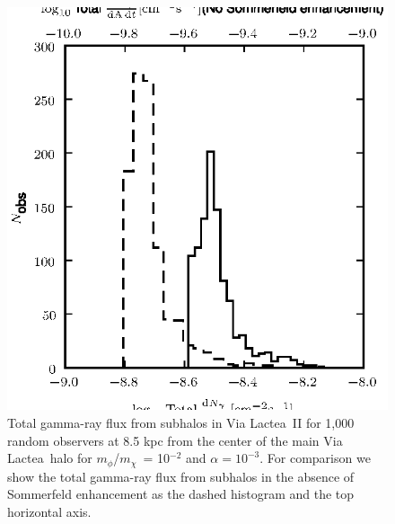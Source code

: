 \documentclass[aps,prd,twocolumn,amsmath,amssymb,floatfix,nofootinbib,10pt]{revtex4}
\newcommand{\VL}{Via Lactea}
\newcommand{\mdm}{\ensuremath{m_{\chi}}}
\newcommand{\mv}{\ensuremath{m_{\phi}}}
\begin{document}
\begin{figure}
\centering
\includegraphics{hist_-2_-3_10_3.eps}
\caption{Total gamma-ray flux from subhalos in \VL\ II for 1,000
random observers at 8.5 kpc from the center of the main \VL\ halo for
\mv/\mdm\ = 10$^{-2}$ and $\alpha = 10^{-3}$. For comparison we show
the total gamma-ray flux from subhalos in the absence of Sommerfeld
enhancement as the dashed histogram and the top horizontal axis.}%
\label{fig:VL23_3}%
\end{figure}
\end{document}
